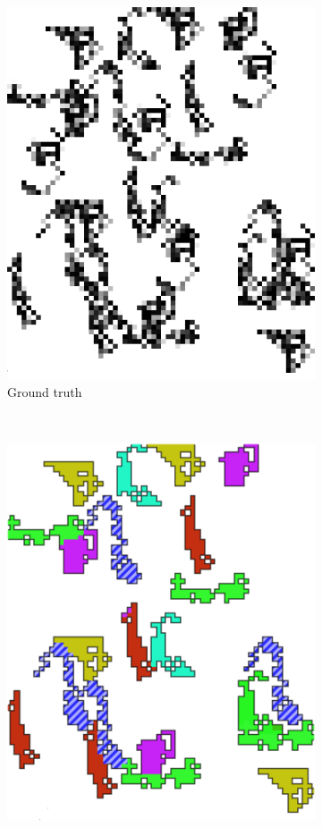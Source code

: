 \documentclass{llncs}
\begin{document}
\begin{figure}[p]
\begin{subfigure}[t]{0.25\textwidth}
\includegraphics[scale=.9]{img/exp_inputpatterns_2_cropped.png}
\caption{Ground truth}
\label{fig:rilb}
\end{subfigure}%
~
\begin{subfigure}[t]{0.25\textwidth}
\centering
\includegraphics[scale=.9]{img/exp_result_2_cropped.png}

\end{subfigure}
\end{figure}
\end{document}
